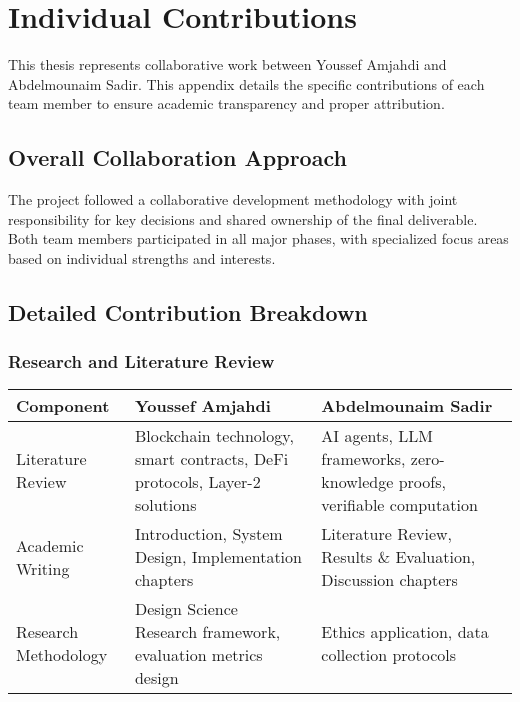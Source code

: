 \chapter{Individual Contributions}
\label{appendix:contributions}

This thesis represents collaborative work between Youssef Amjahdi and Abdelmounaim Sadir. This appendix details the specific contributions of each team member to ensure academic transparency and proper attribution.

\section{Overall Collaboration Approach}

The project followed a collaborative development methodology with joint responsibility for key decisions and shared ownership of the final deliverable. Both team members participated in all major phases, with specialized focus areas based on individual strengths and interests.

\section{Detailed Contribution Breakdown}

\subsection{Research and Literature Review}
\begin{longtable}{p{}p{}p{}}
\toprule
\textbf{Component} & \textbf{Youssef Amjahdi} & \textbf{Abdelmounaim Sadir} \\
\midrule
Literature Review & Blockchain technology, smart contracts, DeFi protocols, Layer-2 solutions & AI agents, LLM frameworks, zero-knowledge proofs, verifiable computation \\
Academic Writing & Introduction, System Design, Implementation chapters & Literature Review, Results \& Evaluation, Discussion chapters \\
Research Methodology & Design Science Research framework, evaluation metrics design & Ethics application, data collection protocols \\
\bottomrule
\end{longtable}

